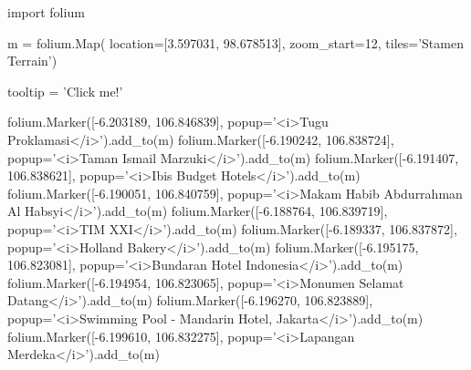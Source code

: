 import folium 

m = folium.Map(
location=[3.597031, 98.678513],
zoom_start=12,
tiles='Stamen Terrain')

tooltip = 'Click me!'

folium.Marker([-6.203189, 106.846839], popup='<i>Tugu Proklamasi</i>').add_to(m)
folium.Marker([-6.190242, 106.838724], popup='<i>Taman Ismail Marzuki</i>').add_to(m)
folium.Marker([-6.191407, 106.838621], popup='<i>Ibis Budget Hotels</i>').add_to(m)
folium.Marker([-6.190051, 106.840759], popup='<i>Makam Habib Abdurrahman Al Habsyi</i>').add_to(m)
folium.Marker([-6.188764, 106.839719], popup='<i>TIM XXI</i>').add_to(m)
folium.Marker([-6.189337, 106.837872], popup='<i>Holland Bakery</i>').add_to(m)
folium.Marker([-6.195175, 106.823081], popup='<i>Bundaran Hotel Indonesia</i>').add_to(m)
folium.Marker([-6.194954, 106.823065], popup='<i>Monumen Selamat Datang</i>').add_to(m)
folium.Marker([-6.196270, 106.823889], popup='<i>Swimming Pool - Mandarin Hotel, Jakarta</i>').add_to(m)
folium.Marker([-6.199610, 106.832275], popup='<i>Lapangan Merdeka</i>').add_to(m)